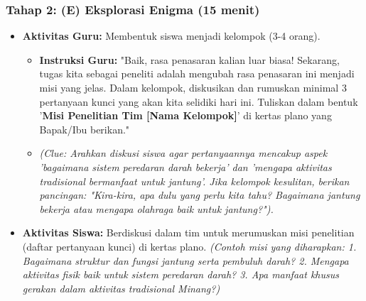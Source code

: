 \documentclass[a4paper,12pt]{article}
\begin{document}
\subsubsection{Tahap 2: (E) Eksplorasi Enigma (15 menit)}
\begin{itemize}
\item \textbf{Aktivitas Guru:} Membentuk siswa menjadi kelompok (3-4 orang).
    \begin{itemize}
    \item \textbf{Instruksi Guru:} "Baik, rasa penasaran kalian luar biasa! Sekarang, tugas kita sebagai peneliti adalah mengubah rasa penasaran ini menjadi misi yang jelas. Dalam kelompok, diskusikan dan rumuskan minimal 3 pertanyaan kunci yang akan kita selidiki hari ini. Tuliskan dalam bentuk '\textbf{Misi Penelitian Tim [Nama Kelompok]}' di kertas plano yang Bapak/Ibu berikan."
    \item \textit{(Clue: Arahkan diskusi siswa agar pertanyaannya mencakup aspek 'bagaimana sistem peredaran darah bekerja' dan 'mengapa aktivitas tradisional bermanfaat untuk jantung'. Jika kelompok kesulitan, berikan pancingan: "Kira-kira, apa dulu yang perlu kita tahu? Bagaimana jantung bekerja atau mengapa olahraga baik untuk jantung?").}
    \end{itemize}
\item \textbf{Aktivitas Siswa:} Berdiskusi dalam tim untuk merumuskan misi penelitian (daftar pertanyaan kunci) di kertas plano. \textit{(Contoh misi yang diharapkan: 1. Bagaimana struktur dan fungsi jantung serta pembuluh darah? 2. Mengapa aktivitas fisik baik untuk sistem peredaran darah? 3. Apa manfaat khusus gerakan dalam aktivitas tradisional Minang?)}
\end{itemize}
\end{document}
